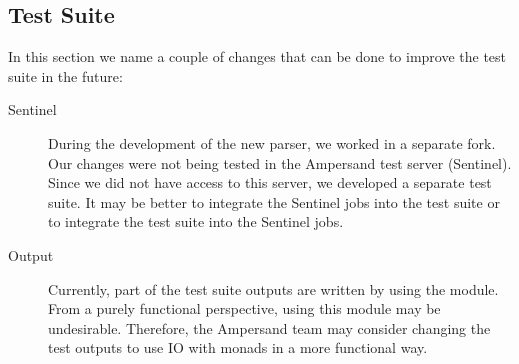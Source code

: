 
\subsection{Test Suite}
\label{recommendations:tests}
  In this section we name a couple of changes that can be done to improve the test suite in the future:
  \begin{description}
    \item[Sentinel] During the development of the new parser, we worked in a separate fork.
      Our changes were not being tested in the Ampersand test server (Sentinel).
      Since we did not have access to this server, we developed a separate test suite.
      It may be better to integrate the Sentinel jobs into the test suite or to integrate the test suite into the Sentinel jobs.
    
    \item[Output] Currently, part of the test suite outputs are written by using the  module.
      From a purely functional perspective, using this module may be undesirable.
      Therefore, the Ampersand team may consider changing the test outputs to use IO with monads in a more functional way.
  \end{description}
